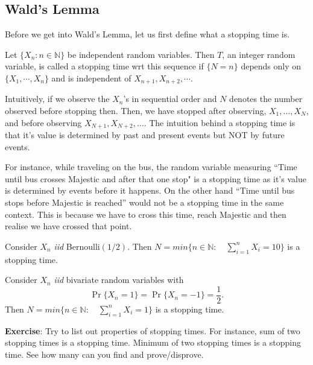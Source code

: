 \documentclass[a4paper,10pt]{article}
\begin{document}
\subsection{Wald's Lemma}
Before we get into Wald's Lemma, let us first define what a stopping time is.
\begin{defn}
Let $\{X_n: n\in \mathbb{N}\}$ be independent random variables. Then $T$, an integer random variable, is called a stopping time wrt this sequence if $\{N=n\}$ depends only on $\{X_1,\cdots,X_n\}$ and is independent of $X_{n+1}, X_{n+2},\cdots$. 
\end{defn}
Intuitively, if we observe the $X_n$'s in sequential order and $N$ denotes the number observed before stopping then. Then, we have stopped after observing, $X_1, \ldots, X_N$, and before observing $X_{N+1}, X_{N+2}, \ldots$. 
The intuition behind a stopping time is that it's value is determined by past and present events but NOT by future events. 
\begin{exmp}
For instance, while traveling on the bus, the random variable measuring ``Time until bus crosses Majestic and after that one stop" is a stopping time as it's value is determined by events before it happens. On the other hand ``Time until bus stops before Majestic is reached'' would not be a stopping time  in the same context. This is because we have to cross this time, reach Majestic and then realise we have crossed that point. 
\end{exmp}
\begin{exmp} Consider $X_n$ \emph{iid} Bernoulli$(1/2)$. Then $N = min \{n \in \mathbb{N}:\quad \sum_{i=1}^n X_i = 10\}$ is a stopping time.
\end{exmp}
\begin{exmp} Consider $X_n$ \emph{iid} bivariate random variables with 
\begin{equation*}
\Pr\{X_n = 1\} = \Pr\{X_n = -1\} = \frac{1}{2}. 
\end{equation*}
Then $N = min \{n \in \mathbb{N}:\quad \sum_{i=1}^n X_i = 1\}$ is a stopping time.
\end{exmp}

\textbf{Exercise}: Try to list out properties of stopping times. For instance, sum of two stopping times is a stopping time. Minimum of two stopping times is a stopping time. See how many can you find and prove/disprove.
\end{document}

